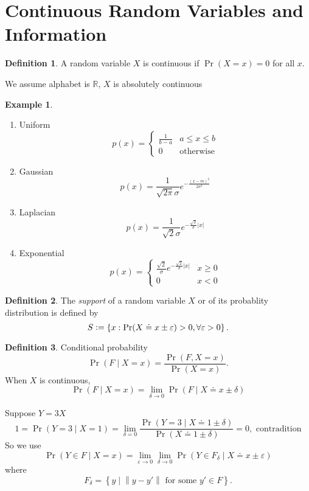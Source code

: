 \documentclass{report}
\newcommand{\R}{\mathbb{R}}
\newcommand{\set}[1]{\left\lbrace #1 \right\rbrace}
\newcommand{\norm}[1]{\left\| #1 \right\|}
\newcommand{\defeq}{\vcentcolon=}
\theoremstyle{definition}
\newtheorem{definition}{Definition}[section]
\newtheorem{example}{Example}[section]
\theoremstyle{remark}
\numberwithin{equation}{section}
\begin{document}
\section{Continuous Random Variables and Information}
\begin{definition}
  A random variable $X$ is continuous if $\Pr(X = x) = 0$ for all $x$.
\end{definition}
We assume alphabet is $\R$, $X$ is absolutely continuous

\begin{example}
  \begin{enumerate}
    \item Uniform \[p(x) = \begin{cases}
      \frac{1}{b-a} & a \leq x \leq b \\
      0 & \text{otherwise}
    \end{cases}\]
    \item Gaussian \[p(x) = \frac{1}{\sqrt{2\pi}\sigma}e^{-\frac{(x-m)^2}{2\sigma^2}}\]
    \item Laplacian \[p(x) = \frac{1}{\sqrt{2}\sigma}e^{-\frac{\sqrt{2}}{\sigma}|x|}\]
    \item Exponential \[p(x) = \begin{cases}
      \frac{\sqrt{2}}{\sigma}e^{-\frac{\sqrt{2}}{\sigma}|x|} & x \geq 0 \\
      0 & x < 0
    \end{cases}\]
  \end{enumerate}
\end{example}

\begin{definition}
  The \emph{support} of a random variable $X$ or of its probablity distribution is defined by \[S \defeq \set{x: \Pr(X \doteq x \pm \varepsilon) > 0, \forall \varepsilon>0}.\]
\end{definition}

\begin{definition}
  Conditional probability \[\Pr(F \mid X = x) = \frac{\Pr(F, X = x)}{\Pr(X = x)}.\]
  When $X$ is continuous, \[\Pr(F \mid X = x) = \lim_{\delta \to 0} \Pr(F \mid X \doteq x \pm \delta)\]
\end{definition}

Suppose $Y = 3X$ \[
  1 = \Pr(Y = 3 \mid X = 1) = \lim_{\delta = 0} \frac{\Pr(Y = 3 \mid X \doteq 1 \pm \delta)}{\Pr(X \doteq 1 \pm \delta)} = 0, \text{ contradition}
\]
So we use \[
  \Pr(Y \in F \mid X = x) = \lim_{\varepsilon \to 0} \lim_{\delta \to 0} \Pr(Y \in F_\delta \mid X \doteq x \pm \varepsilon) 
\] where \[
  F_\delta = \set{y \mid \norm{y - y'} \text{ for some } y' \in F}.
\]
\end{document}
